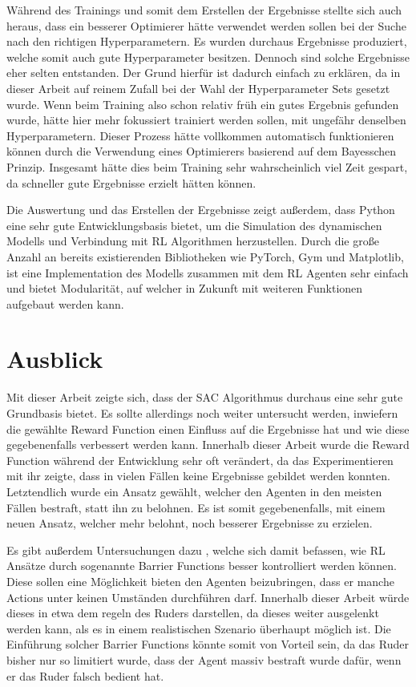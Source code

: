 \documentclass[]{iat}
\begin{document}
Während des Trainings und somit dem Erstellen der Ergebnisse stellte sich auch heraus, dass ein besserer Optimierer hätte verwendet werden sollen bei der Suche nach den richtigen Hyperparametern. Es wurden durchaus Ergebnisse produziert, welche somit auch gute Hyperparameter besitzen. Dennoch sind solche Ergebnisse eher selten entstanden. Der Grund hierfür ist dadurch einfach zu erklären, da in dieser Arbeit auf reinem Zufall bei der Wahl der Hyperparameter Sets gesetzt wurde. Wenn beim Training also schon relativ früh ein gutes Ergebnis gefunden wurde, hätte hier mehr fokussiert trainiert werden sollen, mit ungefähr denselben Hyperparametern. Dieser Prozess hätte vollkommen automatisch funktionieren können durch die Verwendung eines Optimierers basierend auf dem Bayesschen Prinzip. Insgesamt hätte dies beim Training sehr wahrscheinlich viel Zeit gespart, da schneller gute Ergebnisse erzielt hätten können.

Die Auswertung und das Erstellen der Ergebnisse zeigt außerdem, dass Python eine sehr gute Entwicklungsbasis bietet, um die Simulation des dynamischen Modells und Verbindung mit RL Algorithmen herzustellen. Durch die große Anzahl an bereits existierenden Bibliotheken wie PyTorch, Gym und Matplotlib, ist eine Implementation des Modells zusammen mit dem RL Agenten sehr einfach und bietet Modularität, auf welcher in Zukunft mit weiteren Funktionen aufgebaut werden kann.
\section{Ausblick}
Mit dieser Arbeit zeigte sich, dass der SAC Algorithmus durchaus eine sehr gute Grundbasis bietet. Es sollte allerdings noch weiter untersucht werden, inwiefern die gewählte Reward Function einen Einfluss auf die Ergebnisse hat und wie diese gegebenenfalls verbessert werden kann. Innerhalb dieser Arbeit wurde die Reward Function während der Entwicklung sehr oft verändert, da das Experimentieren mit ihr zeigte, dass in vielen Fällen keine Ergebnisse gebildet werden konnten. Letztendlich wurde ein Ansatz gewählt, welcher den Agenten in den meisten Fällen bestraft, statt ihn zu belohnen. Es ist somit gegebenenfalls, mit einem neuen Ansatz, welcher mehr belohnt, noch besserer Ergebnisse zu erzielen.

Es gibt außerdem Untersuchungen dazu \cite[]{10.1609/aaai.v33i01.33013387}, welche sich damit befassen, wie RL Ansätze durch sogenannte Barrier Functions besser kontrolliert werden können. Diese sollen eine Möglichkeit bieten den Agenten beizubringen, dass er manche Actions unter keinen Umständen durchführen darf. Innerhalb dieser Arbeit würde dieses in etwa dem regeln des Ruders darstellen, da dieses weiter ausgelenkt werden kann, als es in einem realistischen Szenario überhaupt möglich ist. Die Einführung solcher Barrier Functions könnte somit von Vorteil sein, da das Ruder bisher nur so limitiert wurde, dass der Agent massiv bestraft wurde dafür, wenn er das Ruder falsch bedient hat.


\printbibliography

\end{document}
